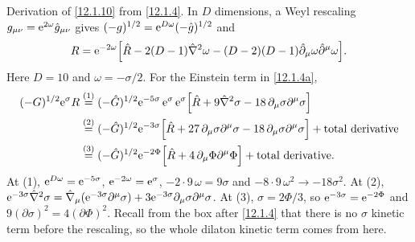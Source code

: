 \begin{tcolorbox}[breakable]
	\begin{remark}
		Derivation of \eqref{12.1.10} from \eqref{12.1.4}. In $D$ dimensions, a Weyl rescaling $g_{\mu\nu}=\mathrm{e}^{2\omega}\hat g_{\mu\nu}$ gives $(-g)^{1/2}=\mathrm{e}^{D\omega}(-\hat g)^{1/2}$ and
		\[
		R=\mathrm{e}^{-2\omega}\Bigl[\hat R-2(D-1)\hat\nabla^{2}\omega-(D-2)(D-1)\hat\partial_{\mu}\omega\hat\partial^{\mu}\omega\Bigr] .
		\]
		Here $D=10$ and $\omega=-\sigma/2$. For the Einstein term in \eqref{12.1.4a},
		\begin{align*}
			(-G)^{1/2}\mathrm{e}^{\sigma}R
			&\overset{(1)}{=} (-\hat G)^{1/2}\mathrm{e}^{-5\sigma}\,\mathrm{e}^{\sigma}\,\mathrm{e}^{\sigma}\Bigl[\hat R+9\hat\nabla^{2}\sigma-18\,\partial_{\mu}\sigma\partial^{\mu}\sigma\Bigr]\\
			&\overset{(2)}{=} (-\hat G)^{1/2}\mathrm{e}^{-3\sigma}\Bigl[\hat R+27\,\partial_{\mu}\sigma\partial^{\mu}\sigma-18\,\partial_{\mu}\sigma\partial^{\mu}\sigma\Bigr]+\text{total derivative}\\
			&\overset{(3)}{=} (-\hat G)^{1/2}\mathrm{e}^{-2\Phi}\Bigl[\hat R+4\,\partial_{\mu}\Phi\partial^{\mu}\Phi\Bigr]+\text{total derivative}.
		\end{align*}
		At (1), $\mathrm{e}^{D\omega}=\mathrm{e}^{-5\sigma}$, $\mathrm{e}^{-2\omega}=\mathrm{e}^{\sigma}$, $-2\cdot9\,\omega=9\sigma$ and $-8\cdot9\,\omega^{2}\to-18\sigma^{2}$. At (2), $\mathrm{e}^{-3\sigma}\hat\nabla^{2}\sigma=\hat\nabla_{\mu}(\mathrm{e}^{-3\sigma}\partial^{\mu}\sigma)+3\mathrm{e}^{-3\sigma}\partial_{\mu}\sigma\partial^{\mu}\sigma$. At (3), $\sigma=2\Phi/3$, so $\mathrm{e}^{-3\sigma}=\mathrm{e}^{-2\Phi}$ and $9(\partial\sigma)^{2}=4(\partial\Phi)^{2}$. Recall from the box after \eqref{12.1.4} that there is no $\sigma$ kinetic term before the rescaling, so the whole dilaton kinetic term comes from here.


\end{remark}
\end{tcolorbox}
